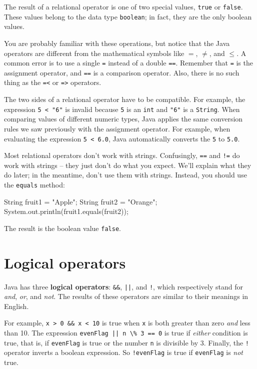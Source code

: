 \documentclass[12pt]{book}
\theoremstyle{exercise}
\newcommand{\java}[1]{\verb"#1"}
\begin{document}
The result of a relational operator is one of two special values, \java{true} or \java{false}.
These values belong to the data type \java{boolean}; in fact, they are the only boolean values.

You are probably familiar with these operations, but notice that the Java operators are different from the mathematical symbols like $=$, $\neq$, and $\le$.
A common error is to use a single \java{=} instead of a double \java{==}.
Remember that \java{=} is the assignment operator, and \java{==} is a comparison operator.
Also, there is no such thing as the \java{=<} or \java{=>} operators.

The two sides of a relational operator have to be compatible.
For example, the expression \verb|5 < "6"| is invalid because \java{5} is an \java{int} and \verb|"6"| is a \java{String}.
When comparing values of different numeric types, Java applies the same conversion rules we saw previously with the assignment operator.
For example, when evaluating the expression \java{5 < 6.0}, Java automatically converts the \java{5} to \java{5.0}.

Most relational operators don't work with strings.
Confusingly, \java{==} and \java{!=} do work with strings -- they just don't do what you expect.
We'll explain what they do later; in the meantime, don't use them with strings.
Instead, you should use the \java{equals} method:

\begin{code}
    String fruit1 = "Apple";
    String fruit2 = "Orange";
    System.out.println(fruit1.equals(fruit2));
\end{code}

The result is the boolean value \java{false}.


\section{Logical operators}


Java has three {\bf logical operators}: \texttt{\&\&}, \java{||}, and \java{!}, which respectively stand for {\it and}, {\it or}, and {\it not}.
The results of these operators are similar to their meanings in English.

For example, \texttt{x > 0 \&\& x < 10} is true when \java{x} is both greater than zero {\em and} less than 10.
The expression \java{evenFlag || n \% 3 == 0} is true if {\em either} condition is true, that is, if \java{evenFlag} is true or the number \java{n} is divisible by 3.
Finally, the \java{!} operator inverts a boolean expression.
So \java{!evenFlag} is true if \java{evenFlag} is {\em not} true.
\end{document}
